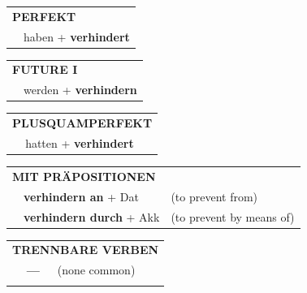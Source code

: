 \documentclass[10pt,a4paper]{revtex4-2}
\begin{document}
\begin{verbbox}
 \begin{tabular}{rl}
     \multicolumn{2}{l}{\textbf{PERFEKT}}\\
   & haben + \textbf{verhindert}\\
  \end{tabular}
\hfill
   \begin{tabular}{rl}
    \multicolumn{2}{l}{\textbf{FUTURE I} }\\
   & werden + \textbf{verhindern}\\
  \end{tabular}
\hfill
   \begin{tabular}{rl}
      \multicolumn{2}{l}{\textbf{PLUSQUAMPERFEKT}}\\
   & hatten + \textbf{verhindert}\\
  \end{tabular}

   \vspace{10pt}

   \begin{tabular}{lll}
      \multicolumn{3}{l}{\textbf{MIT PRÄPOSITIONEN}}\\
& \textbf{verhindern an} + Dat & (to prevent from)\\
& \textbf{verhindern durch} + Akk & (to prevent by means of)\\
\end{tabular}
  \hfill
   \begin{tabular}{lll}
      \multicolumn{3}{l}{\textbf{TRENNBARE VERBEN}}\\
 & \textbf{---} & (none common)\\
\vspace{10pt}
  \end{tabular}

  \vspace{-5pt}

\end{verbbox}
\end{document}

